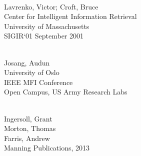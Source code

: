 \documentclass{article}
\begin{document}
\begin{thebibliography}{99}
        \\
        Lavrenko, Victor; Croft, Bruce\\
        Center for Intelligent Information Retrieval\\
        University of Massachusetts \\
        SIGIR`01 September 2001

        \\
        Josang, Audun\\
        University of Oslo\\
        IEEE MFI Conference\\
        Open Campus, US Army Research Labs

        \\
        Ingersoll, Grant\\
        Morton, Thomas\\
        Farris, Andrew\\
        Manning Publications, 2013

\end{thebibliography}
\end{document}
